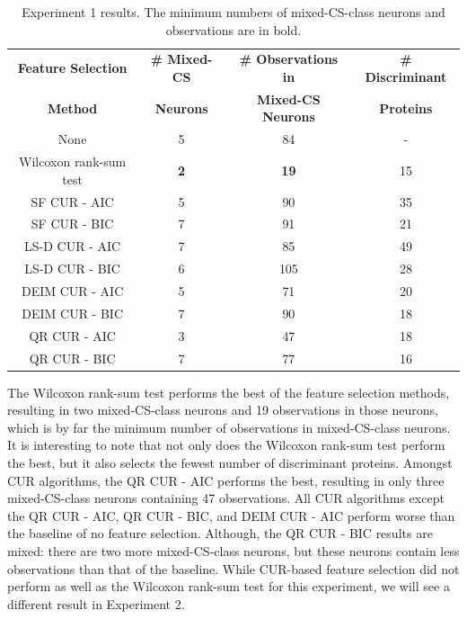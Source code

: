 \documentclass[12pt]{article}
\begin{document}
\begin{table}[h]
    \centering
    \begin{tabular}{|c|c|c|c|}
        \hline
        \textbf{Feature Selection} & \textbf{\# Mixed-CS} & \textbf{\# Observations in} & \textbf{\# Discriminant} \\
        \textbf{Method} & \textbf{Neurons} & \textbf{Mixed-CS Neurons} & \textbf{Proteins} \\
        \hline
        None & 5 & 84 & - \\
        Wilcoxon rank-sum test & \textbf{2} & \textbf{19} & 15 \\
        SF CUR - AIC  &  5 & 90 & 35 \\
        SF CUR - BIC  & 7 & 91 & 21 \\
        LS-D CUR - AIC & 7 & 85 & 49 \\
        LS-D CUR - BIC & 6 &  105 & 28 \\
        DEIM CUR - AIC  & 5 & 71 & 20 \\
        DEIM CUR - BIC  & 7 & 90 & 18 \\
        QR CUR - AIC  & 3 & 47 & 18 \\
        QR CUR - BIC & 7 & 77 & 16 \\
        \hline
    \end{tabular}
    \caption{Experiment 1 results.  The minimum numbers of mixed-CS-class neurons and observations are in bold.}
    \label{tab:CS_res}
\end{table}

The Wilcoxon rank-sum test performs the best of the feature selection methods, resulting in two mixed-CS-class neurons and 19 observations in those neurons, which is by far the minimum number of observations in mixed-CS-class neurons.  It is interesting to note that not only does the Wilcoxon rank-sum test perform the best, but it also selects the fewest number of discriminant proteins.  Amongst CUR algorithms, the QR CUR - AIC performs the best, resulting in only three mixed-CS-class neurons containing 47 observations.  All CUR algorithms except the QR CUR - AIC, QR CUR - BIC, and DEIM CUR - AIC perform worse than the baseline of no feature selection. Although, the QR CUR - BIC results are mixed: there are two more mixed-CS-class neurons, but these neurons contain less observations than that of the baseline.  While CUR-based feature selection did not perform as well as the Wilcoxon rank-sum test for this experiment, we will see a different result in Experiment 2.  
\end{document}
